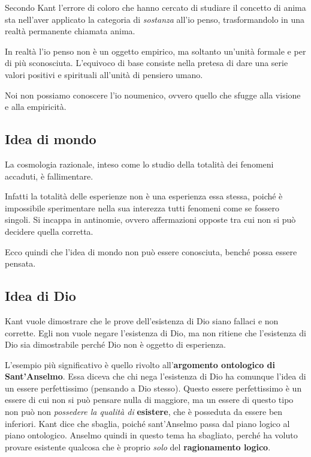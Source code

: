 \documentclass[a4paper, twoside, titlepage]{book}
\begin{document}
Secondo Kant l’errore di coloro che hanno cercato di studiare il concetto di anima sta nell’aver applicato la categoria di \textit{sostanza} all’io penso, trasformandolo in una realtà permanente chiamata anima.

In realtà l’io penso non è un oggetto empirico, ma soltanto un’unità formale e per di più sconosciuta.
L’equivoco di base consiste nella pretesa di dare una serie valori positivi e spirituali all’unità di pensiero umano.

 Noi non possiamo conoscere l’io noumenico, ovvero quello che sfugge alla visione e alla empiricità.

\subsection{Idea di mondo}

La cosmologia razionale, inteso come lo studio della totalità dei fenomeni accaduti, è fallimentare.

Infatti la totalità delle esperienze non è una esperienza essa stessa, poiché è impossibile sperimentare nella sua interezza tutti fenomeni come se fossero singoli. Si incappa in antinomie, ovvero affermazioni opposte tra cui non si può decidere quella corretta.

Ecco quindi che l’idea di mondo non può essere conosciuta, benché possa essere pensata.

\subsection{Idea di Dio}

Kant vuole dimostrare che le prove dell’esistenza di Dio siano fallaci e non corrette. Egli non vuole negare l’esistenza di Dio, ma non ritiene che l’esistenza di Dio sia dimostrabile perché Dio non è oggetto di esperienza.

L’esempio più significativo è quello rivolto all’\textbf{argomento ontologico di Sant’Anselmo}. Essa diceva che chi nega l’esistenza di Dio ha comunque l’idea di un essere perfettissimo (pensando a Dio stesso). Questo essere perfettissimo è un essere di cui non si può pensare nulla di maggiore, ma un essere di questo tipo non può non \textit{possedere la qualità di} \textbf{esistere}, che è posseduta da essere ben inferiori.
Kant dice che sbaglia, poiché sant’Anselmo passa dal piano logico al piano ontologico. Anselmo quindi in questo tema ha sbagliato, perché ha voluto provare esistente qualcosa che è proprio \textit{solo} del \textbf{ragionamento logico}.
\end{document}
